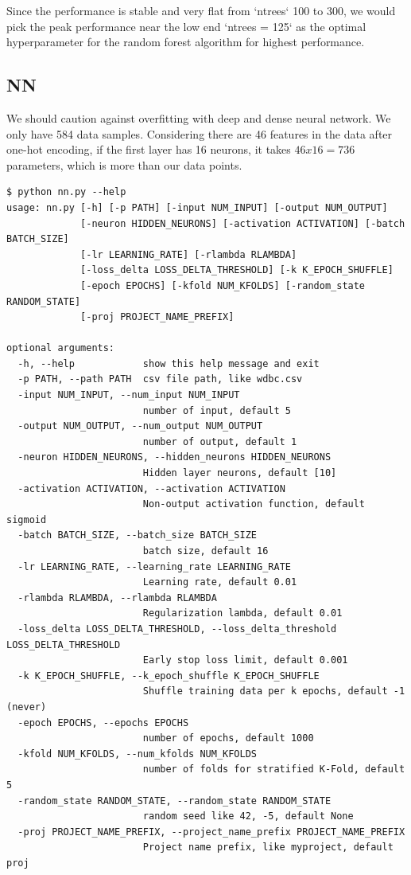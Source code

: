 Since the performance is stable and very flat from `ntrees` 100 to 300, we would pick the peak performance near the low end `ntrees = 125` as the optimal hyperparameter for the random forest algorithm for highest performance. 

\subsection{NN}

We should caution against overfitting with deep and dense neural network. We only have 584 data samples. Considering there are 46 features in the data after one-hot encoding, if the first layer has 16 neurons, it takes $46 x 16 = 736$ parameters, which is more than our data points. 

\begin{verbatim}
$ python nn.py --help
usage: nn.py [-h] [-p PATH] [-input NUM_INPUT] [-output NUM_OUTPUT]
             [-neuron HIDDEN_NEURONS] [-activation ACTIVATION] [-batch BATCH_SIZE]
             [-lr LEARNING_RATE] [-rlambda RLAMBDA]
             [-loss_delta LOSS_DELTA_THRESHOLD] [-k K_EPOCH_SHUFFLE]
             [-epoch EPOCHS] [-kfold NUM_KFOLDS] [-random_state RANDOM_STATE]
             [-proj PROJECT_NAME_PREFIX]

optional arguments:
  -h, --help            show this help message and exit
  -p PATH, --path PATH  csv file path, like wdbc.csv
  -input NUM_INPUT, --num_input NUM_INPUT
                        number of input, default 5
  -output NUM_OUTPUT, --num_output NUM_OUTPUT
                        number of output, default 1
  -neuron HIDDEN_NEURONS, --hidden_neurons HIDDEN_NEURONS
                        Hidden layer neurons, default [10]
  -activation ACTIVATION, --activation ACTIVATION
                        Non-output activation function, default sigmoid
  -batch BATCH_SIZE, --batch_size BATCH_SIZE
                        batch size, default 16
  -lr LEARNING_RATE, --learning_rate LEARNING_RATE
                        Learning rate, default 0.01
  -rlambda RLAMBDA, --rlambda RLAMBDA
                        Regularization lambda, default 0.01
  -loss_delta LOSS_DELTA_THRESHOLD, --loss_delta_threshold LOSS_DELTA_THRESHOLD
                        Early stop loss limit, default 0.001
  -k K_EPOCH_SHUFFLE, --k_epoch_shuffle K_EPOCH_SHUFFLE
                        Shuffle training data per k epochs, default -1 (never)
  -epoch EPOCHS, --epochs EPOCHS
                        number of epochs, default 1000
  -kfold NUM_KFOLDS, --num_kfolds NUM_KFOLDS
                        number of folds for stratified K-Fold, default 5
  -random_state RANDOM_STATE, --random_state RANDOM_STATE
                        random seed like 42, -5, default None
  -proj PROJECT_NAME_PREFIX, --project_name_prefix PROJECT_NAME_PREFIX
                        Project name prefix, like myproject, default proj
\end{verbatim}

